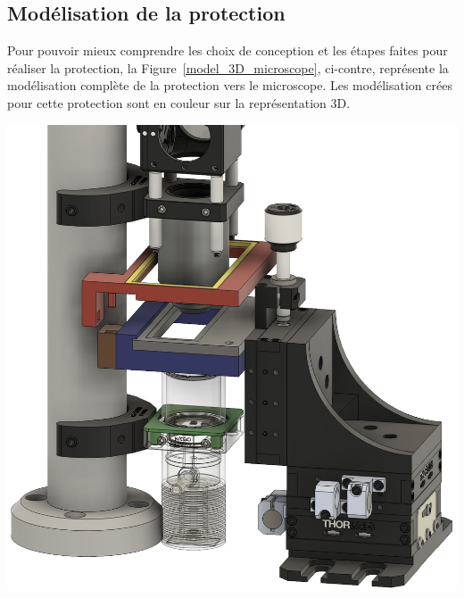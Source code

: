 \subsection{Modélisation de la protection}
\begin{minipage}[c]{0.38\textwidth}
    Pour pouvoir mieux comprendre les choix de conception et les étapes faites pour réaliser la protection, la Figure~\ref{model_3D_microscope}, ci-contre, représente la modélisation complète de la protection vers le microscope. Les modélisation crées pour cette protection sont en couleur sur la représentation 3D.
\end{minipage}\hfill
\begin{minipage}[c]{0.58\textwidth}
    \begin{center}
        \includegraphics[width=\textwidth]{assets/figures/Protections_laser/Securite_mecanique/Protection_vers_microscope/model_3D.jpeg}
    \end{center}
    \label{model_3D_microscope}
\end{minipage}



